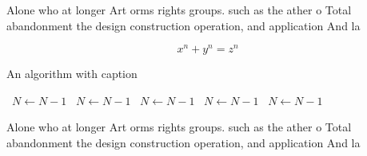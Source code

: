 \documentclass[a4paper]{article}
\begin{document}
Alone who at longer Art orms rights groups. such as the ather o Total abandonment the design construction operation, and application And la

\[ x^n + y^n = z^n \]

\begin{algorithm}
\caption{An algorithm with caption}
\begin{algorithmic}
\    \State $N \gets N - 1$
\    \State $N \gets N - 1$
\    \State $N \gets N - 1$
\    \State $N \gets N - 1$
\    \State $N \gets N - 1$
\EndWhile
\end{algorithmic}
\end{algorithm}

Alone who at longer Art orms rights groups. such as the ather o Total abandonment the design construction operation, and application And la
\end{document}
